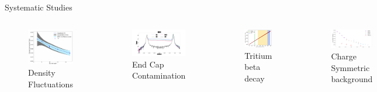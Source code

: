 \documentclass{beamer}
\begin{document}
\begin{frame}{Systematic Studies}
	\vspace{-20pt}
	\begin{columns}
		\begin{figure}\caption{Density Fluctuations}\vspace{-10pt} \includegraphics[width=5cm]{../images/dens}\end{figure}
		\vspace{-10pt}
		\begin{figure}\includegraphics[width=5cm]{../images/ecc}
		\caption{End Cap Contamination}\end{figure}
		\begin{figure}\caption{Tritium beta decay} \includegraphics[width=5cm]{../images/decay}\end{figure}
		\vspace{-10pt}
		\begin{figure}\includegraphics[width=5cm]{../images/pos}
		\caption{Charge Symmetric background}\end{figure}
	\end{columns}
\end{frame}
\end{document}
